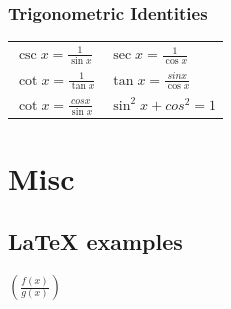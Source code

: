 \documentclass[12pt, letterpaper]{article}
\newcommand\T{\rule{0pt}{8mm}}       %
\begin{document}
\subsubsection{Trigonometric Identities}

\begin{center}
    \begin{tabular}{  p{5cm}  p{5cm} }
        $\csc x = \frac{1}{\sin x }$ & 
        $\sec x = \frac{1}{\cos x }$ \T \\
        
        $\cot x = \frac{1}{\tan x }$ & 
        $\tan x = \frac{sin x}{\cos x }$ \T \\
        $\cot x = \frac{cos x}{\sin x }$ & 
        $\sin^2 x + cos^2 = 1$ \T \\

\end{tabular}
\end{center}
\vspace{1cm}
\section{Misc}
\subsection{LaTeX examples}
$(\frac{f(x)}{g(x)})$
\end{document}
